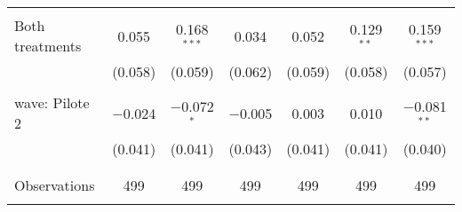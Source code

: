 \begin{tabular}{@{\extracolsep{5pt}}lcccccc}
  & & & & & & \\ 
 Both treatments & 0.055 & 0.168$^{***}$ & 0.034 & 0.052 & 0.129$^{**}$ & 0.159$^{***}$ \\ 
  & (0.058) & (0.059) & (0.062) & (0.059) & (0.058) & (0.057) \\ 
  & & & & & & \\ 
 wave: Pilote 2 & $-$0.024 & $-$0.072$^{*}$ & $-$0.005 & 0.003 & 0.010 & $-$0.081$^{**}$ \\ 
  & (0.041) & (0.041) & (0.043) & (0.041) & (0.041) & (0.040) \\ 
  & & & & & & \\ 
\hline \\[-1.8ex] 

Observations & 499 & 499 & 499 & 499 & 499 & 499 \\ 
\hline 
\hline \\[-1.8ex] 
\end{tabular} 